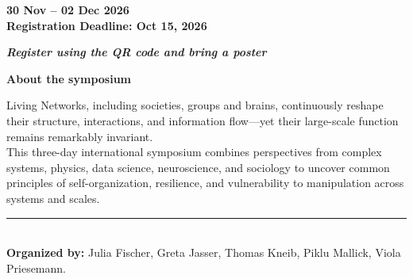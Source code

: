 \documentclass[a4paper,10pt]{article}
\begin{document}
\noindent
\begin{minipage}[t]{0.46\textwidth}
  \begin{tcolorbox}[colback=TealPrimary,colframe=TealPrimary,arc=3mm,coltext=white,center,halign=center]
    {\fontsize{20}{22}\selectfont\textbf{30 Nov -- 02 Dec 2026}}\\[4pt]
    {\footnotesize\textbf{Registration Deadline: Oct 15, 2026}}
  \end{tcolorbox}

  \vspace{6pt}
  \begin{tcolorbox}[colback=white!80!gray,colframe=gray!60!black,arc=2mm,center,halign=center]
    \textit{\textbf{\fontsize{11}{13}\selectfont Register using the QR code and bring a poster}}
  \end{tcolorbox}

  \vspace{6pt}
  {\large\textbf{\color{TealDark}About the symposium}}\\[4pt]
  {\footnotesize
  Living Networks, including societies, groups and brains, continuously reshape their structure, interactions, and information flow---yet their large-scale function remains remarkably invariant.\\[4pt]
  This three-day international symposium combines perspectives from complex systems, physics, data science, neuroscience, and sociology to uncover common principles of self-organization, resilience, and vulnerability to manipulation across systems and scales.\\[4pt]
  \rule{\textwidth}{0.4pt}\\[3pt]
  \textbf{Organized by:} Julia Fischer, Greta Jasser, Thomas Kneib, Piklu Mallick, Viola Priesemann.
  }
\end{minipage}
\hfill
\end{document}
